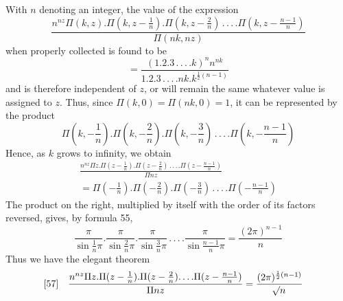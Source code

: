 With $n$ denoting an integer, the value of the expression
\[
\frac{n^{nz}\Pi(k,z).\Pi(k,z-\frac1n).\Pi(k,z-\frac2n)
\,.\,.\,.\,.\Pi(k,z-\frac{n-1}{n})}{\Pi(nk,nz)}
\]
when properly collected is found to be
\[
=\frac{(1.2.3\,.\,.\,.\,.k)^n n^{nk}}
{1.2.3\,.\,.\,.\,.nk.k^{\frac12(n-1)}}
\]
and is therefore independent of $z$, or will remain the same whatever value is assigned to $z$. Thus, since $\Pi(k,0)=\Pi(nk,0)=1$, it can be represented by the product
\[
\Pi(k,-\frac1n).\Pi(k,-\frac2n).\Pi(k,-\frac3n)
\,.\,.\,.\,.\Pi(k,-\frac{n-1}{n})
\]
Hence, as $k$ grows to infinity, we obtain
\[
\begin{gathered}
\frac{n^{nz}\Pi z.\Pi(z-\frac1n).\Pi(z-\frac2n)
\,.\,.\,.\,.\Pi(z-\frac{n-1}{n})}{\Pi nz}\\[4pt]
=\Pi(-\frac1n).\Pi(-\frac2n).\Pi(-\frac3n)
\,.\,.\,.\,.\Pi(-\frac{n-1}{n})
\end{gathered}
\]
The product on the right, multiplied by itself with the order of its factors reversed, gives, by formula 55,
\[
\frac{\pi}{\sin\frac1n\pi}.\frac{\pi}{\sin\frac2n\pi}.
\frac{\pi}{\sin\frac3n\pi}\,.\,.\,.\,.
\frac{\pi}{\sin\frac{n-1}{n}\pi}=\frac{(2\pi)^{n-1}}{n}
\]
Thus we have the elegant theorem
\[
\begin{aligned}
{}\text{[57]}\quad &
\frac{n^{nz}\Pi z.\Pi(z-\frac1n).\Pi(z-\frac2n).\,.\,.\,.
\Pi(z-\frac{n-1}{n})}{\Pi nz}
=\frac{(2\pi)^{\frac12(n-1)}}{\mathord{{}^{}\!\surd}n}
\end{aligned}
\]

